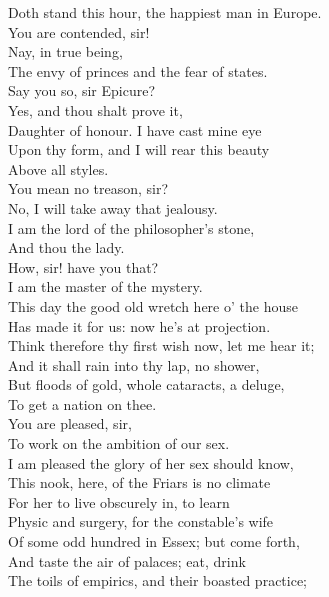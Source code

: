 \documentclass[a4paper,oneside]{memoir}
\begin{document}
\begin{drama*}
Doth stand this hour, the happiest man in Europe.\\
\dolspeaks You are contended, sir!\\
\mammonspeaks {} Nay, in true being,\\
The envy of princes and the fear of states.\\
\dolspeaks Say you so, sir Epicure?\\
\mammonspeaks {} Yes, and thou shalt prove it,\\
Daughter of honour. I have cast mine eye\\
Upon thy form, and I will rear this beauty\\
Above all styles.\\
\dolspeaks {} You mean no treason, sir?\\
\mammonspeaks No, I will take away that jealousy.\\
I am the lord of the philosopher's stone,\\
And thou the lady.\\
\dolspeaks {} How, sir! have you that?\\
\mammonspeaks I am the master of the mystery.\\
This day the good old wretch here o' the house\\
Has made it for us: now he's at projection.\\
Think therefore thy first wish now, let me hear it;\\
And it shall rain into thy lap, no shower,\\
But floods of gold, whole cataracts, a deluge,\\
To get a nation on thee.\\
\dolspeaks {} You are pleased, sir,\\
To work on the ambition of our sex.\\
\mammonspeaks I am pleased the glory of her sex should know,\\
This nook, here, of the Friars is no climate\\
For her to live obscurely in, to learn\\
Physic and surgery, for the constable's wife\\
Of some odd hundred in Essex; but come forth,\\
And taste the air of palaces; eat, drink\\
The toils of empirics, and their boasted practice;\\

\end{drama*}
\end{document}
